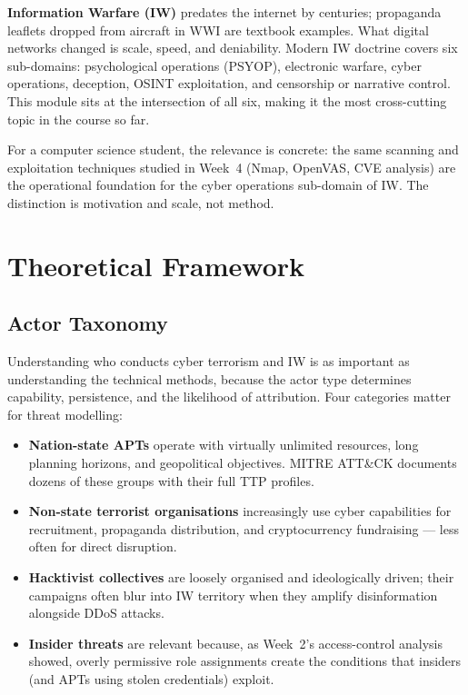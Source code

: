 \documentclass[11pt,a4paper]{article}
\begin{document}
\textbf{Information Warfare (IW)} predates the internet by centuries; propaganda
leaflets dropped from aircraft in WWI are textbook examples. What digital
networks changed is scale, speed, and deniability. Modern IW doctrine covers six
sub-domains: psychological operations (PSYOP), electronic warfare, cyber
operations, deception, OSINT exploitation, and censorship or narrative control.
This module sits at the intersection of all six, making it the most cross-cutting
topic in the course so far.

For a computer science student, the relevance is concrete: the same scanning
and exploitation techniques studied in Week~4 (Nmap, OpenVAS, CVE analysis)
are the operational foundation for the cyber operations sub-domain of IW. The
distinction is motivation and scale, not method.


\section{Theoretical Framework}

\subsection{Actor Taxonomy}

Understanding who conducts cyber terrorism and IW is as important as understanding
the technical methods, because the actor type determines capability, persistence,
and the likelihood of attribution. Four categories matter for threat modelling:

\begin{itemize}[nosep]
  \item \textbf{Nation-state APTs} operate with virtually unlimited resources,
        long planning horizons, and geopolitical objectives. MITRE ATT\&CK documents
        dozens of these groups with their full TTP profiles.
  \item \textbf{Non-state terrorist organisations} increasingly use cyber
        capabilities for recruitment, propaganda distribution, and cryptocurrency
        fundraising --- less often for direct disruption.
  \item \textbf{Hacktivist collectives} are loosely organised and ideologically
        driven; their campaigns often blur into IW territory when they amplify
        disinformation alongside DDoS attacks.
  \item \textbf{Insider threats} are relevant because, as Week~2's access-control
        analysis showed, overly permissive role assignments create the conditions
        that insiders (and APTs using stolen credentials) exploit.
\end{itemize}
\end{document}
